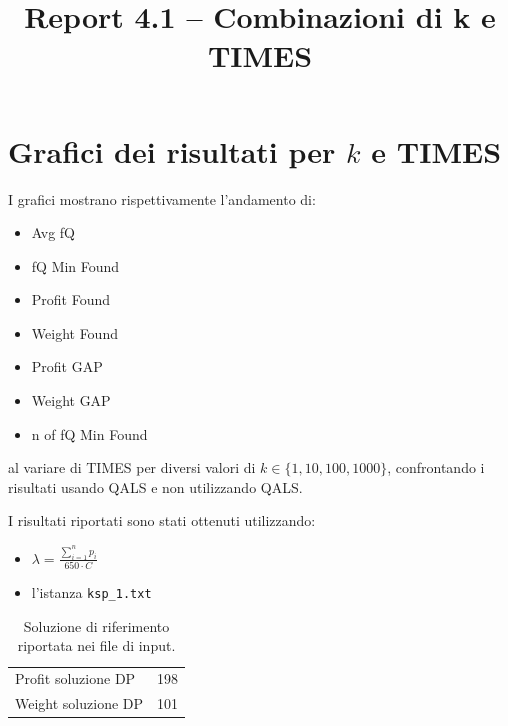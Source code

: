 \documentclass[a4paper,12pt]{article}
\title{Report 4.1 -- Combinazioni di k e TIMES}
\begin{document}
\maketitle

\newpage

\section{Grafici dei risultati per $k$ e TIMES}

I grafici mostrano rispettivamente l'andamento di:
\begin{itemize}
    \item Avg fQ
    \item fQ Min Found
    \item Profit Found
    \item Weight Found
    \item Profit GAP
    \item Weight GAP
    \item n of fQ Min Found
\end{itemize}
al variare di TIMES per diversi valori di $k \in \{1,10,100,1000\}$, confrontando
i risultati usando QALS e non utilizzando QALS.

I risultati riportati sono stati ottenuti utilizzando:

\begin{itemize}
    \item $\lambda = \frac{\sum_{i=1}^{n} p_i}{650 \cdot C}$
    \item l'istanza \texttt{ksp\_1.txt}
\end{itemize}

\begin{table}[H]
\centering
\begin{tabular}{lc}
\hline
Profit soluzione DP & 198 \\
Weight soluzione DP & 101 \\
\hline
\end{tabular}
\caption{Soluzione di riferimento riportata nei file di input.}
\label{tab:knapsack-solution}
\end{table}
\end{document}
